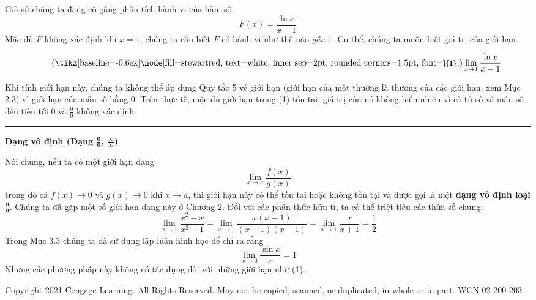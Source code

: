 \noindent
\begin{minipage}[t]{0.23\textwidth}
  \vspace{1pt}
\end{minipage}\hfill\begin{minipage}[t]{0.74\textwidth}
  \fontsize{9.5pt}{13.2pt}\selectfont
  Giả sử chúng ta đang cố gắng phân tích hành vi của hàm số
  \[
    F(x) = \frac{\ln x}{x - 1}
  \]
  Mặc dù $F$ không xác định khi $x = 1$, chúng ta cần biết $F$ có hành vi như thế nào \textit{gần} 1. Cụ thể, chúng ta muốn biết giá trị của giới hạn

  \begin{equation}
    \tag{\tikz[baseline=-0.6ex]\node[fill=stewartred, text=white, inner sep=2pt, rounded corners=1.5pt, font=\sffamily\bfseries\footnotesize]{1};}
    \lim_{x \to 1} \frac{\ln x}{x - 1}
  \end{equation}

  Khi tính giới hạn này, chúng ta không thể áp dụng Quy tắc 5 về giới hạn (giới hạn của một thương là thương của các giới hạn, xem Mục 2.3) vì giới hạn của mẫu số bằng 0. Trên thực tế, mặc dù giới hạn trong (1) tồn tại, giá trị của nó không hiển nhiên vì cả tử số và mẫu số đều tiến tới 0 và $\frac{0}{0}$ không xác định.

  \vspace{8pt}
  \noindent
  {\color{stewartcyan}\rule{5.5pt}{5.5pt}}\hspace{5pt}\textbf{\textsf{Dạng vô định (Dạng $\boldsymbol{\frac{0}{0}}$, $\boldsymbol{\frac{\infty}{\infty}}$)}}

  \vspace{2pt}
  Nói chung, nếu ta có một giới hạn dạng
  \[
    \lim_{x \to a} \frac{f(x)}{g(x)}
  \]
  trong đó cả $f(x) \to 0$ và $g(x) \to 0$ khi $x \to a$, thì giới hạn này có thể tồn tại hoặc không tồn tại và được gọi là một \textbf{dạng vô định loại $\boldsymbol{\frac{0}{0}}$}. Chúng ta đã gặp một số giới hạn dạng này ở Chương 2. Đối với các phân thức hữu tỉ, ta có thể triệt tiêu các thừa số chung:
  \[
    \lim_{x \to 1} \frac{x^2 - x}{x^2 - 1} = \lim_{x \to 1} \frac{x(x - 1)}{(x + 1)(x - 1)} = \lim_{x \to 1} \frac{x}{x + 1} = \frac{1}{2}
  \]
  Trong Mục 3.3 chúng ta đã sử dụng lập luận hình học để chỉ ra rằng
  \[
    \lim_{x \to 0} \frac{\sin x}{x} = 1
  \]
  Nhưng các phương pháp này không có tác dụng đối với những giới hạn như (1).
\end{minipage}

\vfill
\noindent
{\fontsize{6.5pt}{8pt}\selectfont\color{black!55}
Copyright 2021 Cengage Learning. All Rights Reserved. May not be copied, scanned, or duplicated, in whole or in part. WCN 02-200-203
}
